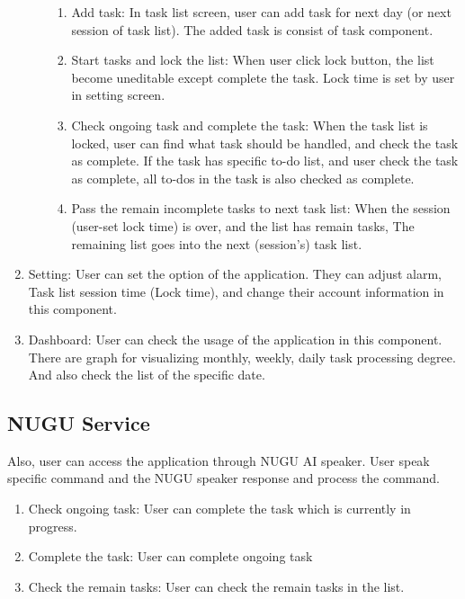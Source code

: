 \documentclass[conference]{IEEEtran}
\begin{document}
\begin{enumerate}
\begin{enumerate}
\begin{enumerate}
            \item Add task: In task list screen, user can add task for next day (or next session of task list). The added task is consist of task component.
            \item Start tasks and lock the list: When user click lock button, the list become uneditable except complete the task. Lock time is set by user in setting screen.
            \item Check ongoing task and complete the task: When the task list is locked, user can find what task should be handled, and check the task as complete. If the task has specific to-do list, and user check the task as complete, all to-dos in the task is also checked as complete.
            \item Pass the remain incomplete tasks to next task list: When the session (user-set lock time) is over, and the list has remain tasks, The remaining list goes into the next (session's) task list.\\
        \end{enumerate}
    \end{enumerate}
    \item Setting: User can set the option of the application. They can adjust alarm, Task list session time (Lock time), and change their account information in this component.\\
    \item Dashboard: User can check the usage of the application in this component. There are graph for visualizing monthly, weekly, daily task processing degree. And also check the list of the specific date.\\
\end{enumerate}

\subsection{NUGU Service}

Also, user can access the application through NUGU AI speaker. User speak specific command and the NUGU speaker response and process the command. \\

\begin{enumerate}
    \item Check ongoing task: User can complete the task which is currently in progress. \\
    \item Complete the task: User can complete ongoing task \\
    \item Check the remain tasks: User can check the remain tasks in the list. \\
\end{enumerate}
\end{document}
